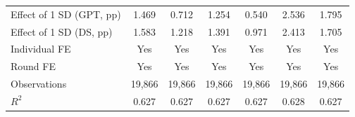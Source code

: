 \begin{table}[H]
\begin{threeparttable}
\begin{tabular}{l*{6}{c}}
Effect of 1 SD (GPT, pp)&       1.469         &       0.712         &       1.254         &       0.540         &       2.536         &       1.795         \\
Effect of 1 SD (DS, pp)&       1.583         &       1.218         &       1.391         &       0.971         &       2.413         &       1.705         \\
Individual FE&         Yes         &         Yes         &         Yes         &         Yes         &         Yes         &         Yes         \\
Round FE    &         Yes         &         Yes         &         Yes         &         Yes         &         Yes         &         Yes         \\
Observations&      19,866         &      19,866         &      19,866         &      19,866         &      19,866         &      19,866         \\
$R^2$       &       0.627         &       0.627         &       0.627         &       0.627         &       0.628         &       0.627         \\
\bottomrule\bottomrule
\end{tabular}
\end{threeparttable}
\end{table}
